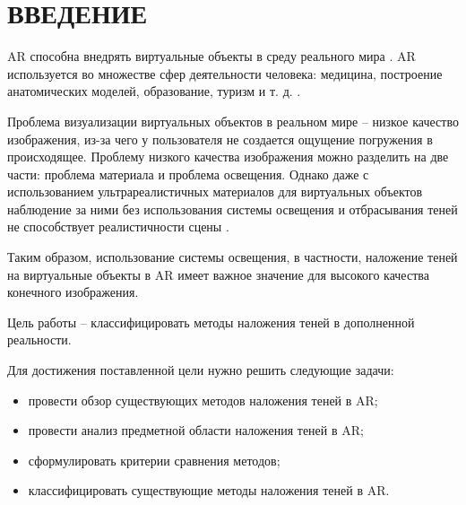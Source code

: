 \chapter*{ВВЕДЕНИЕ}

AR способна внедрять виртуальные объекты в среду реального мира \cite{rtsm}. AR используется во множестве сфер деятельности человека: медицина, построение анатомических моделей, образование, туризм и т. д. \cite{tech-ar}.

Проблема визуализации виртуальных объектов в реальном мире -- низкое качество изображения, из-за чего у пользователя не создается ощущение погружения в происходящее. Проблему низкого качества изображения можно разделить на две части: проблема материала и проблема освещения. Однако даже с использованием ультрареалистичных материалов для виртуальных объектов наблюдение за ними без использования системы освещения и отбрасывания теней не способствует реалистичности сцены \cite{rtsm}.

Таким образом, использование системы освещения, в частности, наложение теней на виртуальные объекты в AR имеет важное значение для высокого качества конечного изображения.

Цель работы -- классифицировать методы наложения теней в дополненной реальности.

Для достижения поставленной цели нужно решить следующие задачи:

\begin{itemize}
	\item провести обзор существующих методов наложения теней в AR;
	\item провести анализ предметной области наложения теней в AR;
	\item сформулировать критерии сравнения методов;
	\item классифицировать существующие методы наложения теней в AR.
\end{itemize}